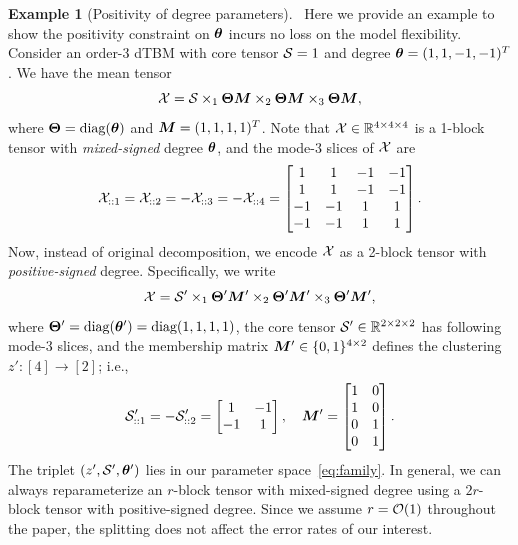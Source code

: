 \documentclass[journal]{IEEEtran}
\theoremstyle{definition}
\theoremstyle{definition}
\newtheorem{example}{Example}
\begin{document}
\begin{example}[Positivity of degree parameters]~\label{ex:positive}
Here we provide an example to show the positivity constraint on $\boldsymbol{\theta}$ incurs no loss on the model flexibility. 
Consider an order-3 dTBM with core tensor $\mathcal{S} = 1$ and degree $\boldsymbol{\theta} = (1,1,-1, -1)^T$. We have the mean tensor 
\begin{equation}
    \mathcal{X} = \mathcal{S} \times_1 \boldsymbol{\Theta} \bm M \times_2 \boldsymbol{\Theta} \bm M \times_3 \boldsymbol{\Theta} \bm M,
\end{equation}
where $\boldsymbol{\Theta} = \text{diag}(\boldsymbol{\theta})$ and $\bm M = (1,1,1,1)^T$. Note that $\mathcal{X} \in \mathbb{R}^{4 \times 4 \times 4}$ is a 1-block tensor with \emph{mixed-signed} degree $\boldsymbol{\theta}$, and the mode-3 slices of $\mathcal{X}$ are
\begin{equation}
    \mathcal{X}_{::1} = \mathcal{X}_{::2} = - \mathcal{X}_{::3} = -\mathcal{X}_{::4}  = \begin{bmatrix}
    1 & 1& -1& -1 \\
    1 & 1& -1& -1 \\
    -1& -1&1 & 1\\
     -1& -1&1 & 1
    \end{bmatrix}.
\end{equation}
Now, instead of original decomposition, we encode $\mathcal{X}$ as a 2-block tensor with \emph{positive-signed} degree. Specifically, we write
\begin{equation}
     \mathcal{X} = \mathcal{S}' \times_1 \boldsymbol{\Theta}' \bm M' \times_2 \boldsymbol{\Theta}' \bm M'  \times_3 \boldsymbol{\Theta}' \bm M' , 
\end{equation}
where $\boldsymbol{\Theta}' = \text{diag}(\boldsymbol{\theta}') = \text{diag}(1,1, 1, 1)$, the core tensor $\mathcal{S}' \in \mathbb{R}^{2 \times 2 \times 2}$ has following mode-3 slices, and the membership matrix $\bm M'\in\{0,1\}^{4\times 2}$ defines the clustering $z'\colon[4]\to[2]$; i.e.,
\begin{equation}
    \mathcal{S}'_{::1} = -\mathcal{S}'_{::2} = \begin{bmatrix}
    1 & -1 \\
    -1 & 1
    \end{bmatrix}, \quad \bm M' = \begin{bmatrix}
   1 & 0 \\
   1 &0 \\
    0 & 1 \\
    0&1
    \end{bmatrix}.
\end{equation}
 The triplet $(z',\mathcal{S}', \boldsymbol{\theta}')$ lies in our parameter space~\eqref{eq:family}. In general, we can always reparameterize an $r$-block tensor with mixed-signed degree using a $2r$-block tensor with positive-signed degree. Since we assume $r=\mathcal{O}(1)$ throughout the paper, the splitting does not affect the error rates of our interest.
 \end{example}
\end{document}

